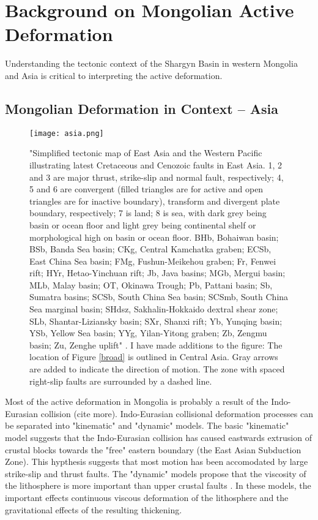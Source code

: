 \section{Background on Mongolian Active Deformation}
	Understanding the tectonic context of the Shargyn Basin in western Mongolia and Asia is critical to interpreting the active deformation. 

\subsection{Mongolian Deformation in Context -- Asia}

\begin{figure}[h!]
	\centering
	\texttt{[image: asia.png]}
	\caption{"Simplified tectonic map of East Asia and the Western Pacific illustrating latest Cretaceous and Cenozoic faults in East Asia. 1, 2 and 3 are major thrust, strike-slip and normal fault, respectively; 4, 5 and 6 are convergent (filled triangles are for active and open triangles are for inactive boundary), transform and divergent plate boundary, respectively; 7 is land; 8 is sea, with dark grey being basin or ocean floor and light grey being continental shelf or morphological high on basin or ocean floor. BHb, Bohaiwan basin; BSb, Banda Sea basin; CKg, Central Kamchatka graben; ECSb, East China Sea basin; FMg, Fushun-Meikehou graben; Fr, Fenwei rift; HYr, Hetao-Yinchuan rift; Jb, Java basins; MGb, Mergui basin; MLb, Malay basin; OT, Okinawa Trough; Pb, Pattani basin; Sb, Sumatra basins; SCSb, South China Sea basin; SCSmb, South China Sea marginal basin; SHdsz, Sakhalin-Hokkaido dextral shear zone; SLb, Shantar-Liziansky basin; SXr, Shanxi rift; Yb, Yunqing basin; YSb, Yellow Sea basin; YYg, Yilan-Yitong graben; Zb, Zengmu basin; Zu, Zenghe uplift" \citep{Schellart2005}. I have made additions to the figure: The location of Figure \ref{broad} is outlined in Central Asia. Gray arrows are added to indicate the direction of motion. The zone with spaced right-slip faults are surrounded by a dashed line.}
	\label{asia}
\end{figure}	

	Most of the active deformation in Mongolia is probably a result of the Indo-Eurasian collision \citep{Yin2010}(cite more). Indo-Eurasian collisional deformation processes can be separated into "kinematic" and "dynamic" models. The basic "kinematic" model suggests that the Indo-Eurasian collision has caused eastwards extrusion of crustal blocks towards the "free" eastern boundary (the East Asian Subduction Zone)\citet{Tapponier1982}\citep{Peltzer1996}. This hypthesis suggests that most motion has been accomodated by large strike-slip and thrust faults. The "dynamic" models propose that the viscosity of the lithosphere is more important than upper crustal faults \citep{Houseman1993}\citep{England1997}. In these models, the important effects continuous viscous deformation of the lithosphere and the gravitational effects of the resulting thickening. 

